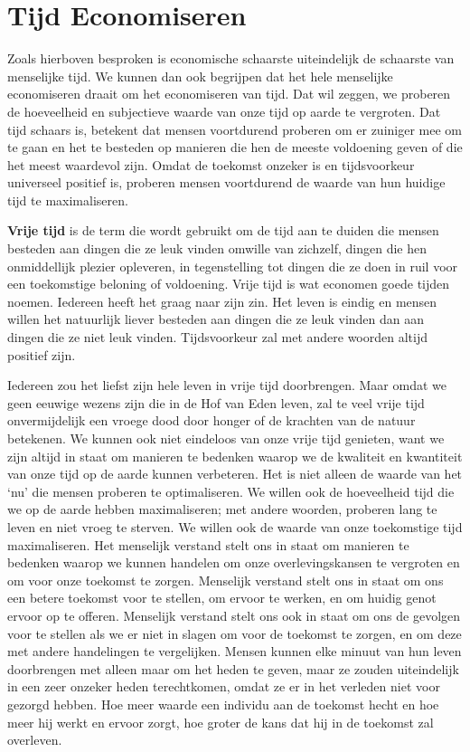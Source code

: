 \section{Tijd Economiseren}

Zoals hierboven besproken is economische schaarste uiteindelijk de
schaarste van menselijke tijd. We kunnen dan ook begrijpen dat het hele
menselijke economiseren draait om het economiseren van tijd. Dat wil
zeggen, we proberen de hoeveelheid en subjectieve waarde van onze tijd
op aarde te vergroten. Dat tijd schaars is, betekent dat mensen
voortdurend proberen om er zuiniger mee om te gaan en het te besteden op
manieren die hen de meeste voldoening geven of die het meest waardevol
zijn. Omdat de toekomst onzeker is en tijdsvoorkeur universeel positief
is, proberen mensen voortdurend de waarde van hun huidige tijd te
maximaliseren. 

\textbf{Vrije tijd} is de term die wordt gebruikt om de
tijd aan te duiden die mensen besteden aan dingen die ze leuk vinden
omwille van zichzelf, dingen die hen onmiddellijk plezier opleveren, in
tegenstelling tot dingen die ze doen in ruil voor een toekomstige
beloning of voldoening. Vrije tijd is wat economen goede tijden noemen.
Iedereen heeft het graag naar zijn zin. Het leven is eindig en mensen
willen het natuurlijk liever besteden aan dingen die ze leuk vinden dan
aan dingen die ze niet leuk vinden. Tijdsvoorkeur zal met andere woorden
altijd positief zijn.

Iedereen zou het liefst zijn hele leven in vrije tijd doorbrengen. Maar
omdat we geen eeuwige wezens zijn die in de Hof van Eden leven, zal te
veel vrije tijd onvermijdelijk een vroege dood door honger of de
krachten van de natuur betekenen. We kunnen ook niet eindeloos van onze
vrije tijd genieten, want we zijn altijd in staat om manieren te
bedenken waarop we de kwaliteit en kwantiteit van onze tijd op de aarde
kunnen verbeteren. Het is niet alleen de waarde van het `nu' die mensen
proberen te optimaliseren. We willen ook de hoeveelheid tijd die we op
de aarde hebben maximaliseren; met andere woorden, proberen lang te
leven en niet vroeg te sterven. We willen ook de waarde van onze
toekomstige tijd maximaliseren. Het menselijk verstand stelt ons in
staat om manieren te bedenken waarop we kunnen handelen om onze
overlevingskansen te vergroten en om voor onze toekomst te zorgen.
Menselijk verstand stelt ons in staat om ons een betere toekomst voor te
stellen, om ervoor te werken, en om huidig genot ervoor op te offeren.
Menselijk verstand stelt ons ook in staat om ons de gevolgen voor te
stellen als we er niet in slagen om voor de toekomst te zorgen, en om
deze met andere handelingen te vergelijken. Mensen kunnen elke minuut
van hun leven doorbrengen met alleen maar om het heden te geven, maar ze
zouden uiteindelijk in een zeer onzeker heden terechtkomen, omdat ze er
in het verleden niet voor gezorgd hebben. Hoe meer waarde een individu
aan de toekomst hecht en hoe meer hij werkt en ervoor zorgt, hoe groter
de kans dat hij in de toekomst zal overleven.

